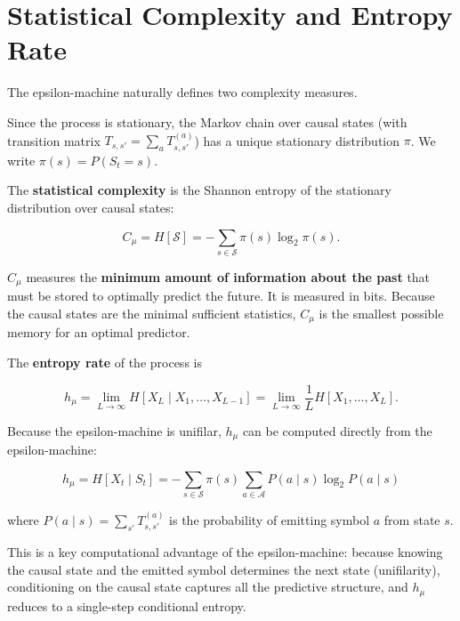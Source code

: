 \section{Statistical Complexity and Entropy Rate}

The epsilon-machine naturally defines two complexity measures.

\begin{definition}
Since the process is stationary, the Markov chain over causal states (with transition matrix $T_{s,s'} = \sum_{a} T^{(a)}_{s,s'}$) has a unique stationary distribution $\pi$. We write $\pi(s) = P(S_t = s)$.
\end{definition}

\begin{definition}
The \textbf{statistical complexity} is the Shannon entropy of the stationary distribution over causal states:

\[C_\mu = H[\mathcal{S}] = -\sum_{s \in \mathcal{S}} \pi(s) \log_2 \pi(s).\]

$C_\mu$ measures the \textbf{minimum amount of information about the past} that must be stored to optimally predict the future. It is measured in bits. Because the causal states are the minimal sufficient statistics, $C_\mu$ is the smallest possible memory for an optimal predictor.
\end{definition}

\begin{definition}
The \textbf{entropy rate} of the process is

\[h_\mu = \lim_{L \to \infty} H[X_L \mid X_1, \ldots, X_{L-1}] = \lim_{L \to \infty} \frac{1}{L} H[X_1, \ldots, X_L].\]

Because the epsilon-machine is unifilar, $h_\mu$ can be computed directly from the epsilon-machine:

\[h_\mu = H[X_t \mid S_t] = -\sum_{s \in \mathcal{S}} \pi(s) \sum_{a \in \mathcal{A}} P(a \mid s) \log_2 P(a \mid s)\]

where $P(a \mid s) = \sum_{s'} T^{(a)}_{s,s'}$ is the probability of emitting symbol $a$ from state $s$.

This is a key computational advantage of the epsilon-machine: because knowing the causal state and the emitted symbol determines the next state (unifilarity), conditioning on the causal state captures all the predictive structure, and $h_\mu$ reduces to a single-step conditional entropy.
\end{definition}



